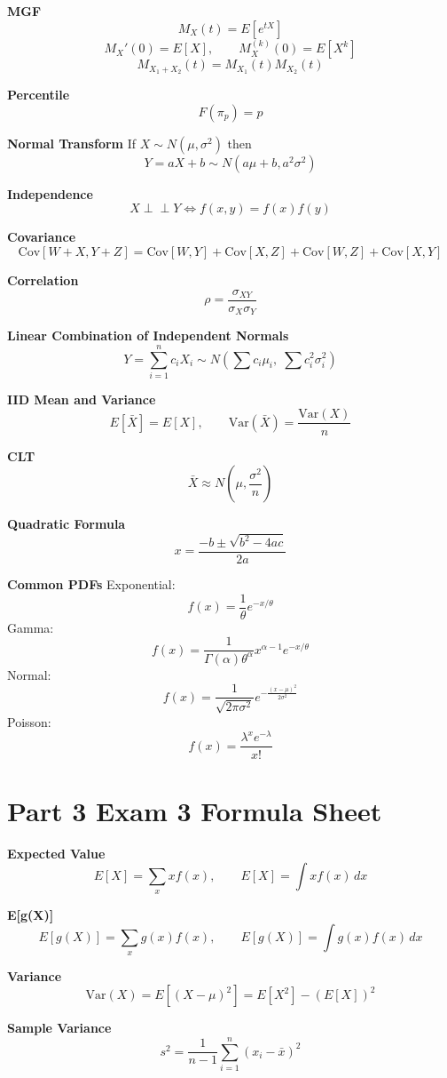\documentclass[11pt,letterpaper]{article}
\theoremstyle{remark}
\begin{document}
\textbf{MGF}
\[
M_X(t)=E[e^{tX}] \tag{5a}
\]
\[
M_X'(0)=E[X], \qquad M_X^{(k)}(0)=E[X^k] \tag{5b, 5c}
\]
\[
M_{X_1+X_2}(t)=M_{X_1}(t)M_{X_2}(t) \tag{5d}
\]

\textbf{Percentile}
\[
F(\pi_p)=p \tag{6}
\]

\textbf{Normal Transform}
If $X\sim N(\mu,\sigma^2)$ then
\[
Y=aX+b \sim N(a\mu+b, a^2\sigma^2) \tag{7}
\]

\textbf{Independence}
\[
X \perp\!\!\perp Y \iff f(x,y)=f(x)f(y) \tag{8}
\]

\textbf{Covariance}
\[
\mathrm{Cov}[W+X, Y+Z] = \mathrm{Cov}[W,Y]+\mathrm{Cov}[X,Z]+\mathrm{Cov}[W,Z]+\mathrm{Cov}[X,Y] \tag{9}
\]

\textbf{Correlation}
\[
\rho = \frac{\sigma_{XY}}{\sigma_X \sigma_Y} \tag{10}
\]

\textbf{Linear Combination of Independent Normals}
\[
Y=\sum_{i=1}^n c_i X_i
\sim N\left(\sum c_i\mu_i,\;\sum c_i^2 \sigma_i^2\right)
\]

\textbf{IID Mean and Variance}
\[
E[\bar{X}] = E[X], \qquad \mathrm{Var}(\bar{X})=\frac{\mathrm{Var}(X)}{n} \tag{11}
\]

\textbf{CLT}
\[
\bar{X} \approx N\left(\mu, \frac{\sigma^2}{n}\right) \tag{12}
\]

\textbf{Quadratic Formula}
\[
x = \frac{-b \pm \sqrt{b^2 - 4ac}}{2a} \tag{13}
\]

\textbf{Common PDFs}
Exponential:
\[
f(x)=\frac{1}{\theta}e^{-x/\theta}
\]
Gamma:
\[
f(x)=\frac{1}{\Gamma(\alpha)\theta^\alpha}x^{\alpha-1}e^{-x/\theta}
\]
Normal:
\[
f(x)=\frac{1}{\sqrt{2\pi\sigma^2}}e^{-\frac{(x-\mu)^2}{2\sigma^2}}
\]
Poisson:
\[
f(x)=\frac{\lambda^x e^{-\lambda}}{x!}
\]


\section*{Part 3 Exam 3 Formula Sheet}

\textbf{Expected Value}
\[
E[X]=\sum_x x f(x), \qquad E[X]=\int x f(x)\,dx \tag{1}
\]

\textbf{E[g(X)]}
\[
E[g(X)]=\sum_x g(x)f(x), \qquad
E[g(X)]=\int g(x)f(x)\,dx \tag{2}
\]

\textbf{Variance}
\[
\mathrm{Var}(X)=E[(X-\mu)^2] = E[X^2]-(E[X])^2 \tag{3}
\]

\textbf{Sample Variance}
\[
s^2 = \frac{1}{n-1}\sum_{i=1}^n (x_i - \bar{x})^2 \tag{4}
\]
\end{document}
